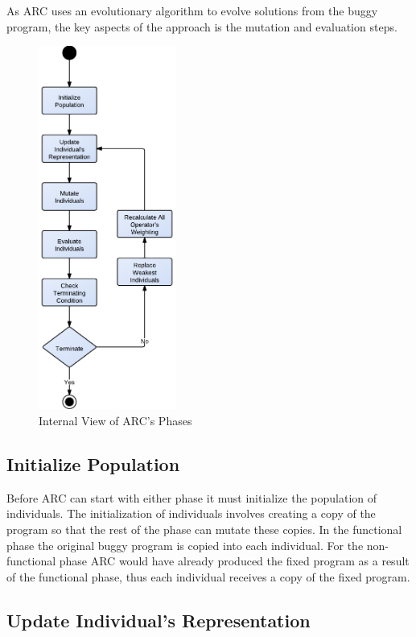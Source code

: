 \documentclass[10pt, conference, compsocconf]{IEEEtran}
\begin{document}
As ARC uses an evolutionary algorithm to evolve solutions from the buggy
program, the key aspects of the approach is the mutation and evaluation steps.

\begin{figure}[!h]
  \centering
  \includegraphics[width=4.50cm]{figures/phases.pdf}
  \caption{Internal View of ARC's Phases}
  \label{fig:phases_internals}
\end{figure}

\subsection{Initialize Population}
\label{sec:initialize_population}

Before ARC can start with either phase it must initialize the population of
individuals. The initialization of individuals involves creating a copy of the
program so that the rest of the phase can mutate these copies. In the
functional phase the original buggy program is copied into each individual. For
the non-functional phase ARC would have already produced the fixed program as a
result of the functional phase, thus each individual receives a copy of the
fixed program.

\subsection{Update Individual's Representation}
\label{sec:update_individual_representation}
\end{document}
